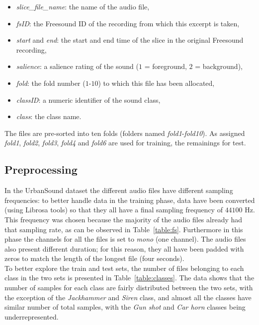 \documentclass[oneside,openany]{article}
\begin{document}
    \begin{itemize}
    \item \textit{slice\_file\_name}: the name of the audio file,
    \item \textit{fsID}: the Freesound ID of the recording from which this excerpt is taken,
    \item \textit{start} and \textit{end}: the start and end time of the slice in the original Freesound recording,
    \item \textit{salience}: a salience rating of the sound ($1$ = foreground, $2$ = background),
    \item \textit{fold}: the fold number ($1$-$10$) to which this file has been allocated,
    \item \textit{classID}: a numeric identifier of the sound class,
    \item \textit{class}: the class name.
    \end{itemize}
    
    The files are pre-sorted into ten folds (folders named \textit{fold1}-\textit{fold10}). As assigned \textit{fold1}, \textit{fold2}, \textit{fold3}, \textit{fold4} and \textit{fold6} are used for training, the remainings for test.
    
    \subsection{Preprocessing}
    \label{subsection:preprocessing}
    In the UrbanSound dataset the different audio files have different sampling frequencies: to better handle data in the training phase, data have been converted (using Librosa tools) so that they all have a final sampling frequency of $44100$ Hz. This frequency was chosen because the majority of the audio files already had that sampling rate, as can be observed in Table~\ref{table:fs}. Furthermore in this phase the channels for all the files is set to \textit{mono} (one channel). 
    The audio files also present different duration; for this reason, they all have been padded with zeros to match the length of the longest file (four seconds).\\
    To better explore the train and test sets, the number of files belonging to each class in the two sets is presented in Table~\ref{table:classes}. 
    The data shows that the number of samples for each class are fairly distributed between the two sets, with the exception of the \textit{Jackhammer} and \textit{Siren} class, and almost all the classes have similar number of total samples, with the \textit{Gun shot} and \textit{Car horn} classes being underrepresented. 
\end{document}
